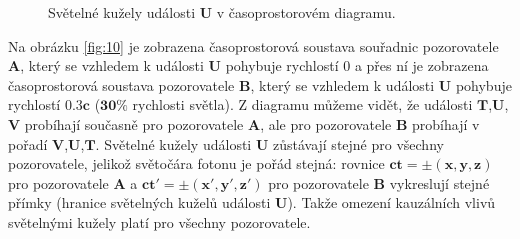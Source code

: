 \begin{enumerate}
\begin{figure}[ht]
        \caption{\label{fig:9}Světelné kužely události $\bm{U}$ v časoprostorovém diagramu.}
    \end{figure}

Na obrázku \ref{fig:10} je zobrazena časoprostorová soustava souřadnic pozorovatele $\bm{A}$, který se vzhledem k události $\bm{U}$ pohybuje rychlostí $0$ a přes ní je zobrazena časoprostorová soustava pozorovatele $\bm{B}$, který se vzhledem k události $\bm{U}$ pohybuje rychlostí $\bm{0.3c}$ ($\bm{30\%}$ rychlosti světla). Z diagramu můžeme vidět, že události $\bm{T}$,$\bm{U}$,$\bm{V}$ probíhají současně pro pozorovatele $\bm{A}$, ale pro pozorovatele $\bm{B}$ probíhají v pořadí $\bm{V}$,$\bm{U}$,$\bm{T}$. Světelné kužely události $\bm{U}$ zůstávají stejné pro všechny pozorovatele, jelikož světočára fotonu je pořád stejná: rovnice $\bm{ct=\pm(x,y,z)}$ pro pozorovatele $\bm{A}$ a $\bm{ct'=\pm(x',y',z')}$ pro pozorovatele $\bm{B}$ vykreslují stejné přímky (hranice světelných kuželů události $\bm{U}$). Takže omezení kauzálních vlivů světelnými kužely platí pro všechny pozorovatele.

\begin{figure}[ht]

    \centering

\end{figure}
\end{enumerate}
